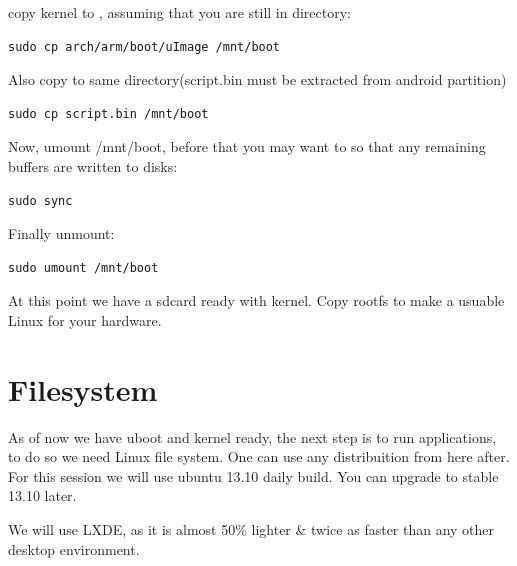 \documentclass[letterpaper,10pt,english]{sphinxmanual}
\begin{document}
\begin{enumerate}
copy kernel to , assuming that you are still in  directory:

\begin{Verbatim}[commandchars=\\\{\}]
sudo cp arch/arm/boot/uImage /mnt/boot
\end{Verbatim}

Also copy  to same directory(script.bin must be extracted from android
partition)

\begin{Verbatim}[commandchars=\\\{\}]
sudo cp script.bin /mnt/boot
\end{Verbatim}

Now, umount /mnt/boot, before that you may want to  so that any
remaining buffers are written to disks:

\begin{Verbatim}[commandchars=\\\{\}]
sudo sync
\end{Verbatim}

Finally unmount:

\begin{Verbatim}[commandchars=\\\{\}]
sudo umount /mnt/boot
\end{Verbatim}

\end{enumerate}

At this point we have a sdcard ready with kernel. Copy rootfs
to make a usuable Linux for your hardware.

\begin{DUlineblock}{0em}
\item[] 
\item[] 
\item[] 
\end{DUlineblock}


\section{Filesystem}
\label{embedded-linux:filesystem}
As of now we have uboot and kernel ready, the next step is to run applications, to
do so we need Linux file system. One can use any distribuition from here after.
For this session we will use ubuntu 13.10 daily build. You can upgrade to stable
13.10 later.

We will use LXDE, as it is almost 50\% lighter \& twice as faster than any other
desktop environment.
\end{document}
